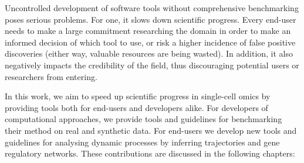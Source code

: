 Uncontrolled development of software tools without comprehensive benchmarking poses serious problems. 
For one, it slows down scientific progress. Every end-user needs to make a large commitment researching the domain in order to make an informed decision of which tool to use, or risk a higher incidence of false positive discoveries (either way, valuable resources are being wasted). In addition, it also negatively impacts the credibility of the field, thus discouraging potential users or researchers from entering.

In this work, we aim to speed up scientific progress in single-cell omics by providing tools both for end-users and developers alike. For developers of computational approaches, we provide tools and guidelines for benchmarking their method on real and synthetic data. For end-users we develop new tools and guidelines for analysing dynamic processes by inferring trajectories and gene regulatory networks. These contributions are discussed in the following chapters:

